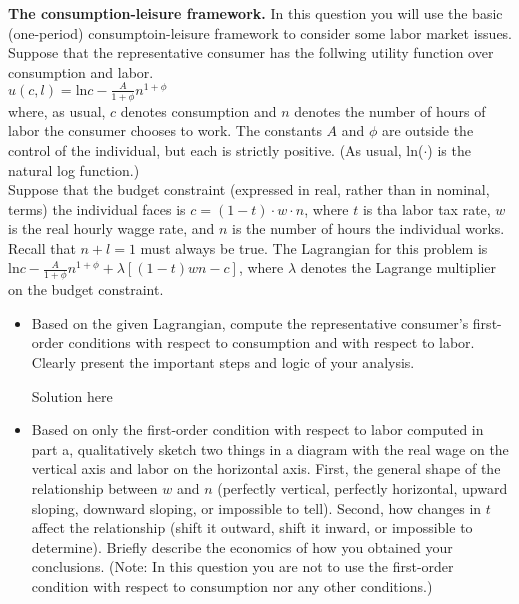 \documentclass[11pt]{SelfArxOneColBMN}
\begin{document}
\begin{exercise}
	\textbf{The consumption-leisure framework.} In this question you will use the basic (one-period) consumptoin-leisure framework to consider some labor market issues. Suppose that the representative consumer has the follwing utility function over consumption and labor.\\
	\indent $u(c,l) = \text{ln}c - \frac{A}{1 + \phi}n^{1+\phi}$\\
	where, as usual, $c$ denotes consumption and $n$ denotes the number of hours of labor the consumer chooses to work. The constants $A$ and $\phi$ are outside the control of the individual, but each is strictly positive. (As usual, ln($\cdot$) is the natural log function.)\\
	Suppose that the budget constraint (expressed in real, rather than in nominal, terms) the individual faces is $c = (1 - t)\cdot w \cdot n$, where $t$ is tha labor tax rate, $w$ is the real hourly wagge rate, and $n$ is the number of hours the individual works.\\
	Recall that $n + l = 1$ must always be true. The Lagrangian for this problem is\\
	\indent $\text{ln}c-\frac{A}{1 + \phi}n^{1 + \phi} + \lambda[(1 - t)wn - c]$, where $\lambda$ denotes the Lagrange multiplier on the budget constraint.
	\begin{itemize} 
		\item Based on the given Lagrangian, compute the representative consumer's first-order conditions with respect to consumption and with respect to labor. Clearly present the important steps and logic of your analysis.
		\begin{solution}
			Solution here
		\end{solution}
		\item Based on only the first-order condition with respect to labor computed in part a, qualitatively sketch two things in a diagram with the real wage on the vertical axis and labor on the horizontal axis. First, the general shape of the relationship between $w$ and $n$ (perfectly vertical, perfectly horizontal, upward sloping, downward sloping, or impossible to tell). Second, how changes in $t$ affect the relationship (shift it outward, shift it inward, or impossible to determine). Briefly describe the economics of how you obtained your conclusions. (Note: In this question you are not to use the first-order condition with respect to consumption nor any other conditions.)
		\begin{solution}

\end{solution}
\end{itemize}
\end{exercise}
\end{document}
